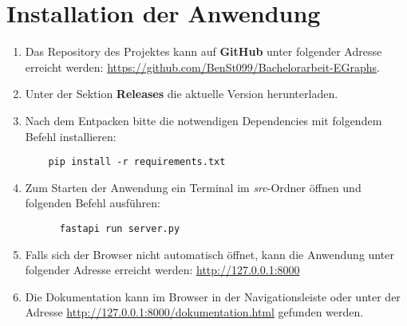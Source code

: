 \section{Installation der Anwendung}

\begin{enumerate}
  \item Das Repository des Projektes kann auf \textbf{GitHub} unter folgender Adresse erreicht werden: \url{https://github.com/BenSt099/Bachelorarbeit-EGraphs}.
  \item Unter der Sektion \textbf{Releases} die aktuelle Version herunterladen.
  \item Nach dem Entpacken bitte die notwendigen Dependencies mit folgendem Befehl installieren:
  
  \begin{verbatim}
    pip install -r requirements.txt
  \end{verbatim}

  \item Zum Starten der Anwendung ein Terminal im \textit{src}-Ordner öffnen und folgenden Befehl ausführen:

  \begin{verbatim}
      fastapi run server.py
  \end{verbatim}
  
  \item Falls sich der Browser nicht automatisch öffnet, kann die Anwendung unter folgender Adresse erreicht werden:
  \url{http://127.0.0.1:8000}
  \item Die Dokumentation kann im Browser in der Navigationsleiste oder unter der Adresse \url{http://127.0.0.1:8000/dokumentation.html} gefunden werden.
\end{enumerate}